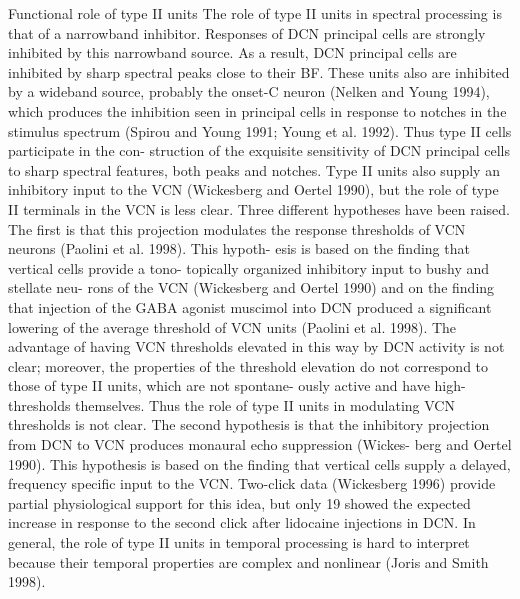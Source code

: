{Functional role of type II units
The role of type II units in spectral processing is that of a
narrowband inhibitor. Responses of DCN principal cells are
strongly inhibited by this narrowband source. As a result, DCN
principal cells are inhibited by sharp spectral peaks close to
their BF. These units also are inhibited by a wideband source,
probably the onset-C neuron (Nelken and Young 1994), which
produces the inhibition seen in principal cells in response to
notches in the stimulus spectrum (Spirou and Young 1991;
Young et al. 1992). Thus type II cells participate in the con-
struction of the exquisite sensitivity of DCN principal cells to
sharp spectral features, both peaks and notches.
Type II units also supply an inhibitory input to the VCN
(Wickesberg and Oertel 1990), but the role of type II terminals
in the VCN is less clear. Three different hypotheses have been
raised. The ﬁrst is that this projection modulates the response
thresholds of VCN neurons (Paolini et al. 1998). This hypoth-
esis is based on the ﬁnding that vertical cells provide a tono-
topically organized inhibitory input to bushy and stellate neu-
rons of the VCN (Wickesberg and Oertel 1990) and on the
ﬁnding that injection of the GABA agonist muscimol into DCN
produced a signiﬁcant lowering of the average threshold of
VCN units (Paolini et al. 1998). The advantage of having VCN
thresholds elevated in this way by DCN activity is not clear;
moreover, the properties of the threshold elevation do not
correspond to those of type II units, which are not spontane-
ously active and have high-thresholds themselves. Thus the
role of type II units in modulating VCN thresholds is not clear.
The second hypothesis is that the inhibitory projection from
DCN to VCN produces monaural echo suppression (Wickes-
berg and Oertel 1990). This hypothesis is based on the ﬁnding
that vertical cells supply a delayed, frequency speciﬁc input to
the VCN. Two-click data (Wickesberg 1996) provide partial
physiological support for this idea, but only 19%
showed the expected increase in response to the second click
after lidocaine injections in DCN. In general, the role of type
II units in temporal processing is hard to interpret because their
temporal properties are complex and nonlinear (Joris and
Smith 1998).

}
